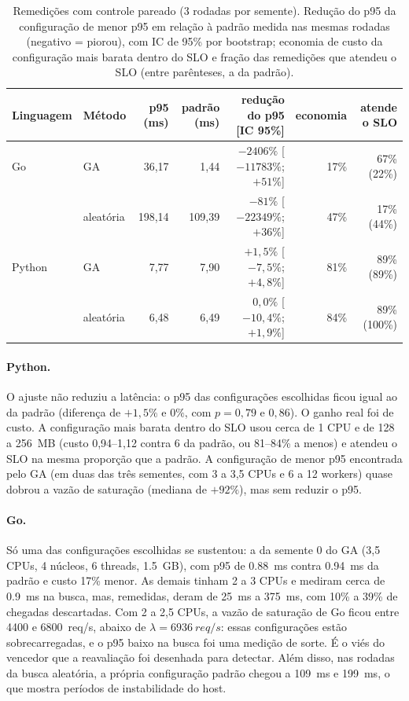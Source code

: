 \documentclass[11pt,a4paper]{article}
\begin{document}
\begin{table}[ht]
\centering
\caption{Remedições com controle pareado (3 rodadas por semente). Redução do p95 da configuração de menor p95 em
relação à padrão medida nas mesmas rodadas (negativo = piorou), com IC de 95\% por bootstrap; economia de custo da
configuração mais barata dentro do SLO e fração das remedições que atendeu o SLO (entre parênteses, a da padrão).}
\label{tab:h3}
\small
\setlength{\tabcolsep}{3.5pt}
\begin{tabular}{llrrrrr}
\toprule
Linguagem & Método & p95 (ms) & padrão (ms) & redução do p95 [IC 95\%] & economia & atende o SLO \\
\midrule
Go     & GA        & 36,17 & 1,44   & $-2406\%$ [$-11783\%$; $+51\%$] & 17\% & 67\% (22\%) \\
       & aleatória & 198,14 & 109,39 & $-81\%$ [$-22349\%$; $+36\%$]  & 47\% & 17\% (44\%) \\
\midrule
Python & GA        & 7,77  & 7,90   & $+1{,}5\%$ [$-7{,}5\%$; $+4{,}8\%$] & 81\% & 89\% (89\%) \\
       & aleatória & 6,48  & 6,49   & $0{,}0\%$ [$-10{,}4\%$; $+1{,}9\%$] & 84\% & 89\% (100\%) \\
\bottomrule
\end{tabular}
\end{table}

\paragraph{Python.} O ajuste não reduziu a latência: o p95 das configurações escolhidas ficou igual ao da padrão
(diferença de $+1{,}5\%$ e $0\%$, com $p = 0{,}79$ e $0{,}86$). O ganho real foi de custo. A configuração mais barata
dentro do SLO usou cerca de 1 CPU e de \SI{128}{} a \SI{256}{MB} (custo 0,94--1,12 contra 6 da padrão, ou 81--84\% a menos)
e atendeu o SLO na mesma proporção que a padrão. A configuração de menor p95 encontrada pelo GA (em duas das três sementes, com 3 a 3,5 CPUs
e 6 a 12 workers) quase dobrou a vazão de saturação (mediana de $+92\%$), mas sem reduzir o p95.

\paragraph{Go.} Só uma das configurações escolhidas se sustentou: a da semente 0 do GA (3,5 CPUs, 4 núcleos, 6 threads,
\SI{1,5}{GB}), com p95 de \SI{0,88}{ms} contra \SI{0,94}{ms} da padrão e custo 17\% menor. As demais tinham 2 a 3 CPUs e
mediram cerca de \SI{0,9}{ms} na busca, mas, remedidas, deram de \SI{25}{ms} a \SI{375}{ms}, com 10\% a 39\% de chegadas
descartadas. Com 2 a 2,5 CPUs, a vazão de saturação de Go ficou entre \SI{4400}{} e \SI{6800}{req/s}, abaixo de
$\lambda = \SI{6936}{req/s}$: essas configurações estão sobrecarregadas, e o p95 baixo na busca foi uma medição de sorte.
É o viés do vencedor que a reavaliação foi desenhada para detectar. Além disso, nas rodadas da busca aleatória, a própria
configuração padrão chegou a \SI{109}{ms} e \SI{199}{ms}, o que mostra períodos de instabilidade do host.
\end{document}
